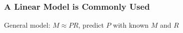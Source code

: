 \documentclass[usenames,dvipsnames,15pt]{beamer}
\begin{document}
\subsection{}

\begin{frame}
  \frametitle{A Linear Model is Commonly Used}
  General model: $M \approx PR$,  predict $P$ with known $M$ and $R$
  \vspace{-.25cm}
  \renewcommand{\arraystretch}{0.6}
  \setlength\arraycolsep{1pt}
  \renewcommand{\kbldelim}{[}%
  \renewcommand{\kbrdelim}{]}%
  \small\vspace{-.5cm}


\end{frame}
\end{document}
